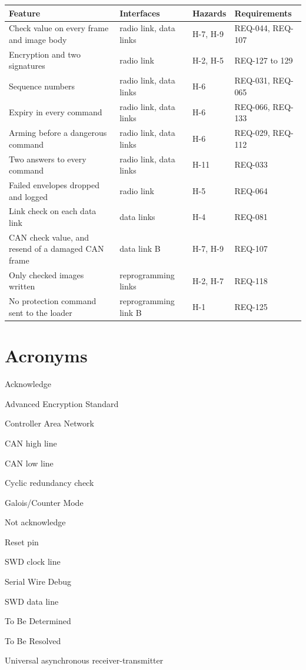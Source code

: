 \documentclass[11pt,a4paper]{article}
\renewcommand{\thesection}{\arabic{section}.0}
\renewcommand{\thesubsection}{\arabic{section}.\arabic{subsection}}
\begin{document}
\smallskip
{\small\noindent\begin{tabularx}{\textwidth}{@{}>{\raggedright\arraybackslash}X>{\raggedright\arraybackslash}p{3.4cm}ll@{}}
\toprule
Feature & Interfaces & Hazards & Requirements \\
\midrule
Check value on every frame and image body & radio link, data links & H-7, H-9 & REQ-044, REQ-107 \\
Encryption and two signatures & radio link & H-2, H-5 & REQ-127 to 129 \\
Sequence numbers & radio link, data links & H-6 & REQ-031, REQ-065 \\
Expiry in every command & radio link, data links & H-6 & REQ-066, REQ-133 \\
Arming before a dangerous command & radio link, data links & H-6 & REQ-029, REQ-112 \\
Two answers to every command & radio link, data links & H-11 & REQ-033 \\
Failed envelopes dropped and logged & radio link & H-5 & REQ-064 \\
Link check on each data link & data links & H-4 & REQ-081 \\
CAN check value, and resend of a damaged CAN frame & data link B & H-7, H-9 & REQ-107 \\
Only checked images written & reprogramming links & H-2, H-7 & REQ-118 \\
No protection command sent to the loader & reprogramming link B & H-1 & REQ-125 \\
\bottomrule
\end{tabularx}}

\appendix
\renewcommand{\thesection}{\Alph{section}}
\renewcommand{\thesubsection}{\Alph{section}.\arabic{subsection}}

\section{Acronyms}
\begin{description}[leftmargin=2.2cm]
\item[ACK] Acknowledge
\item[AES] Advanced Encryption Standard
\item[CAN] Controller Area Network
\item[CANH] CAN high line
\item[CANL] CAN low line
\item[CRC] Cyclic redundancy check
\item[GCM] Galois/Counter Mode
\item[NACK] Not acknowledge
\item[NRST] Reset pin
\item[SWCLK] SWD clock line
\item[SWD] Serial Wire Debug
\item[SWDIO] SWD data line
\item[TBD] To Be Determined
\item[TBR] To Be Resolved
\item[UART] Universal asynchronous receiver-transmitter
\end{description}
\end{document}
